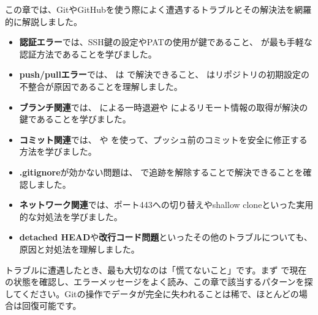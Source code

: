 この章では、GitやGitHubを使う際によく遭遇するトラブルとその解決法を網羅的に解説しました。

\begin{itemize}
  \item \textbf{認証エラー}では、SSH鍵の設定やPATの使用が鍵であること、 が最も手軽な認証方法であることを学びました。
  \item \textbf{push/pullエラー}では、 は  で解決できること、 はリポジトリの初期設定の不整合が原因であることを理解しました。
  \item \textbf{ブランチ関連}では、 による一時退避や  によるリモート情報の取得が解決の鍵であることを学びました。
  \item \textbf{コミット関連}では、 や  を使って、プッシュ前のコミットを安全に修正する方法を学びました。
  \item \textbf{.gitignore}が効かない問題は、 で追跡を解除することで解決できることを確認しました。
  \item \textbf{ネットワーク関連}では、ポート443への切り替えやshallow cloneといった実用的な対処法を学びました。
  \item \textbf{detached HEAD}や\textbf{改行コード問題}といったその他のトラブルについても、原因と対処法を理解しました。
\end{itemize}

トラブルに遭遇したとき、最も大切なのは「慌てないこと」です。まず  で現在の状態を確認し、エラーメッセージをよく読み、この章で該当するパターンを探してください。Gitの操作でデータが完全に失われることは稀で、ほとんどの場合は回復可能です。
